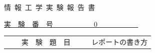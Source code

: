 \documentclass[autodetect-engine,dvipdfmx-if-dvi,ja=standard]{bxjsarticle}
\begin{document}
\thispagestyle{empty}
\vspace{1cm}
\begin{center}
    \fontsize{30pt}{0pt} \selectfont
    情~報~工~学~実~験~報~告~書
\end{center}
\vspace{1.4cm}
\begin{center}
    \underline{
        \fontsize{14pt}{0pt} \selectfont
        実~~験~~番~~号~~~~~~~~~~~
        \fontsize{18pt}{0pt} \selectfont
        0
        \fontsize{14pt}{0pt} \selectfont
        ~~~~~~~~~~~
    }
\end{center}
\vspace{0.4cm}
\begin{table}[h]
    \begin{center}
        \begin{tabular}{| c | l |} \hline
            \parbox[c][1.5cm][c]{0cm}{}
            ~~~~実~~験~~題~~目~~~~ &
            \parbox[c][1.5cm][c]{12cm}{
                \fontsize{14pt}{0pt} \selectfont
                レポートの書き方
            }
            \\ \hline
        \end{tabular}
    \end{center}
\end{table}
\end{document}
